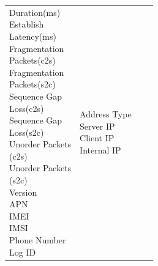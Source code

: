 \begin{description}
\begin{longtable}{p{}|p{}|p{}|p{}}
{                                                                            Duration(ms)\\
                                                                            Establish\\ Latency(ms)\\
                                                                            Fragmentation\\ Packets(c2s)\\
                                                                            Fragmentation\\ Packets(s2c)\\
                                                                            Sequence Gap\\ Loss(c2s)\\
                                                                            Sequence Gap\\ Loss(s2c)\\
                                                                            Unorder Packets\\(c2s)\\
                                                                            Unorder Packets\\(s2c)\\
                                                                            Version\\
                                                                            APN\\
                                                                            IMEI\\
                                                                            IMSI\\
                                                                            Phone Number\\
                                                                            Log ID}  &  \tabincell{l}{Address Type\\
                                                                                                    Server IP\\
                                                                                                    Client IP\\
                                                                                                    Internal IP\\
}
\end{longtable}
\end{description}
